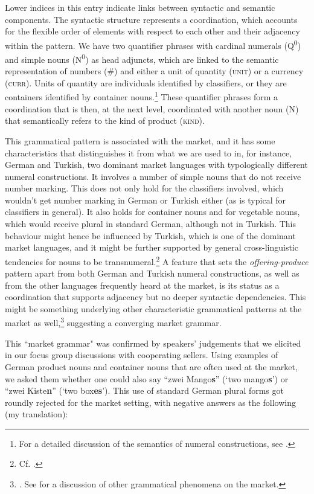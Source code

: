 Lower indices in this entry indicate links between syntactic and semantic components. The syntactic structure represents a coordination, which accounts for the flexible order of elements with respect to each other and their adjacency within the pattern. We have two quantifier phrases with cardinal numerals (Q\textsuperscript{0}) and simple nouns (N\textsuperscript{0}) as head adjuncts, which are linked to the semantic representation of numbers (\#) and either a unit of quantity (\textsc{unit}) or a currency (\textsc{curr}). Units of quantity are individuals identified by classifiers, or they are containers identified by container nouns.\footnote{For a detailed discussion of the semantics of numeral constructions, see \citet{Wiese2003}.} These quantifier phrases form a coordination that is then, at the next level, coordinated with another noun (N) that semantically refers to the kind of product (\textsc{kind}).

This grammatical pattern is associated with the market, and it has some characteristics that distinguishes it from what we are used to in, for instance, German and Turkish, two dominant market languages with typologically different numeral constructions. It involves a number of simple nouns that do not receive number marking. This does not only hold for the classifiers involved, which wouldn’t get number marking in German or Turkish either (as is typical for classifiers in general). It also holds for container nouns and for vegetable nouns, which would receive plural in standard German, although not in Turkish. This behaviour might hence be influenced by Turkish, which is one of the dominant market languages, and it might be further supported by general cross-linguistic tendencies for nouns to be transnumeral.\footnote{Cf. \citet{Wiese2019}.} A feature that sets the \textit{offering-produce} pattern apart from both German and Turkish numeral constructions, as well as from the other languages frequently heard at the market, is its status as a coordination that supports adjacency but no deeper syntactic dependencies. This might be something underlying other characteristic grammatical patterns at the market as well,\footnote{\citet{WieseSchumann2020}. See \citet{SchumannEtAl2021} for a discussion of other grammatical phenomena on the market.} suggesting a converging market grammar.

This “market grammar" was confirmed by speakers’ judgements that we elic\-ited in our focus group discussions with cooperating sellers. Using examples of German product nouns and container nouns that are often used at the market, we asked them whether one could also say “zwei Mango\textbf{s}” (‘two mango\textbf{s}’) or “zwei Kiste\textbf{n}” (‘two box\textbf{es}’). This use of standard German plural forms got roundly rejected for the market setting, with negative answers as the following (my translation):

